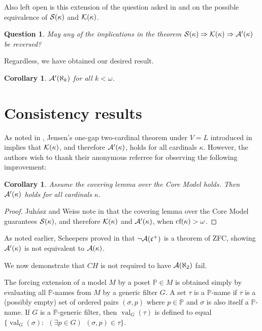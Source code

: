 \documentclass{amsart}
\theoremstyle{plain}
\newtheorem{corollary}[theorem]{Corollary}
\newtheorem{question}[theorem]{Question}
\theoremstyle{definition}
\theoremstyle{remark}
\theoremstyle{plain}
\theoremstyle{definition}
\theoremstyle{remark}
\def\val{\operatorname{val}}
\begin{document}
  Also left open is this extension of the question asked in \cite{NYIKOSKUREPA}
  and \cite{MR539228} on the possible equivalence of \(\mathcal{S}(\kappa)\)
  and \(\mathcal{K}(\kappa)\).

  \begin{question}
    May any of the implications in the theorem
    \(\mathcal{S}(\kappa)\Rightarrow\mathcal{K}(\kappa)\Rightarrow\mathcal{A}'(\kappa)\)
    be reversed?
  \end{question}

  Regardless, we have obtained our desired result.

  \begin{corollary}
    \(\mathcal{A}'(\aleph_k)\) for all \(k<\omega\).
  \end{corollary}




  \section{Consistency results}

  As noted in \cite{MR1229125}, Jensen's one-gap two-cardinal theorem under
  \(V=L\) introduced in \cite{MR0309729} implies that \(\mathcal{K}(\kappa)\),
  and therefore \(\mathcal{A}'(\kappa)\), holds for all cardinals \(\kappa\).
  However, the authors wish to thank their anonymous referree for
  observing the following improvement:

  \begin{corollary}\label{alcompSPunderV=L}
    Assume the covering lemma over the Core Model holds. Then
    \(\mathcal{A}'(\kappa)\) holds for all cardinals \(\kappa\).
  \end{corollary}

  \begin{proof}
    Juh\'asz and Weiss note in \cite[pg. 186]{juhaszgood} that the covering
    lemma over the Core Model guarantees \(\mathcal{S}(\kappa)\), and therefore
    \(\mathcal{K}(\kappa)\) and \(\mathcal{A}'(\kappa)\), when
    \(\textrm{cf}(\kappa)>\omega\).
  \end{proof}

  As noted earlier, Scheepers proved in \cite{MR1129143}
  that \(\neg\mathcal{A}(\mathfrak{c}^+)\) is a theorem of ZFC, showing
  \(\mathcal{A}'(\kappa)\) is not equivalent to \(\mathcal{A}(\kappa)\).

  We now demonstrate that \(CH\) is not required to have \(\mathcal{A}(\aleph_2)\)
  fail.



            The forcing extension of a model $M$ by a poset $\mathbb P\in M$ is
            obtained simply by evaluating all $\mathbb P$-names from $M$ by a
            generic filter $G$.
             A set $\tau$ is a $\mathbb P$-name if $\tau$ is a
             (possibly empty)
            set of ordered pairs $(\sigma,p)$ where $p\in \mathbb P$ and
             $\sigma$ is also itself a $\mathbb P$-name.
            If $G$ is a $\mathbb P$-generic filter, then
             $\val_G(\tau) $ is defined to equal
              $\{ \val_G(\sigma) : ~~(\exists p\in G)~~(\sigma,p)\in \tau\}$.
\end{document}
